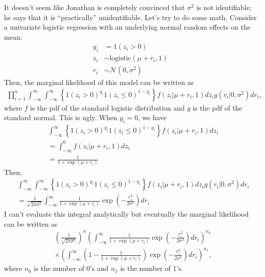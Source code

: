 \documentclass{article}\usepackage[]{graphicx}\usepackage[]{color}
\begin{document}
It doesn't seem like Jonathan is completely convinced that $\sigma^2$ is not identifiable; he says that it is ``practically'' unidentifiable. Let's try to do some math. Consider a univariate logistic regression with an underlying normal random effects on the mean:
\begin{equation}
\begin{aligned}
y_i &= 1(z_i > 0)\\
z_i &\sim \mathrm{logistic}(\mu + r_i, 1)\\
r_i &\sim \mathcal{N}(0, \sigma^2)
\end{aligned}
\end{equation}
Then, the marginal likelihood of this model can be written as 
\begin{equation}
\begin{aligned}
\prod_{i=1}^{n} \int_{-\infty}^\infty \int_{-\infty}^\infty \left\{1(z_i>0)^{y_i} 1(z_i \leq 0)^{1 - y_i} \right\} f(z_i | \mu + r_i, 1) dz_i g(r_i|0, \sigma^2) dr_i,
\end{aligned}
\end{equation}
where $f$ is the pdf of the standard logistic distribution and $g$ is the pdf of the standard normal.
This is ugly. 
When $y_i = 0$, we have 
\begin{equation}
\begin{aligned}
&\int_{-\infty}^\infty \left\{1(z_i>0)^{y_i} 1(z_i \leq 0)^{1 - y_i} \right\} f(z_i | \mu + r_i, 1) dz_i\\
&= \int_{-\infty}^0 f(z_i | \mu + r_i, 1) dz_i\\
&= \frac{1}{1 + \exp(\mu + r_i)}
\end{aligned}
\end{equation}
Then,
\begin{equation}
\begin{aligned}
&\int_{-\infty}^\infty \int_{-\infty}^\infty \left\{1(z_i>0)^{y_i} 1(z_i \leq 0)^{1 - y_i} \right\} f(z_i | \mu + r_i, 1) dz_i g(r_i|0, \sigma^2) dr_i\\
&= \frac{1}{\sqrt{2\pi\sigma^2}}  \int_{-\infty}^\infty \frac{1}{1 + \exp(\mu + r_i)} \exp\left(- \frac{r_i^2}{2\sigma^2} \right) dr_i
\end{aligned}
\end{equation}
I can't evaluate this integral analytically but eventually the marginal likelihood can be written as 
\begin{equation}
\begin{aligned}
&\left(\frac{1}{\sqrt{2\pi\sigma^2}}\right)^n \left(\int_{-\infty}^\infty \frac{1}{1 + \exp(\mu + r_i)} \exp\left(- \frac{r_i^2}{2\sigma^2} \right) dr_i\right)^{n_0} \\
&\times \left(\int_{-\infty}^\infty \left(1- \frac{1}{1 + \exp(\mu + r_i)}\right) \exp\left(- \frac{r_i^2}{2\sigma^2} \right) dr_i\right)^{n_1},
\end{aligned}
\end{equation}
where $n_0$ is the number of 0's and $n_1$ is the number of 1's. 
\end{document}
